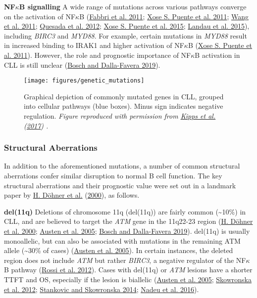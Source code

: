 \documentclass[11pt, a4paper, twosided]{book}
\begin{document}
\textbf{NF\(\kappa\)B signalling}
A wide range of mutations across various pathways converge on the activation of NF\(\kappa\)B (\protect\hyperlink{ref-Fabbri2011}{Fabbri et al. 2011}; \protect\hyperlink{ref-Puente2011}{Xose S. Puente et al. 2011}; \protect\hyperlink{ref-Wang2011}{Wang et al. 2011}; \protect\hyperlink{ref-Quesada2012}{Quesada et al. 2012}; \protect\hyperlink{ref-Puente2015}{Xose S. Puente et al. 2015}; \protect\hyperlink{ref-Landau2015}{Landau et al. 2015}), including \emph{BIRC3} and \emph{MYD88}. For example, certain mutations in \emph{MYD88} result in increased binding to IRAK1 and higher activation of NF\(\kappa\)B (\protect\hyperlink{ref-Puente2011}{Xose S. Puente et al. 2011}). However, the role and prognostic importance of NF\(\kappa\)B activation in CLL is still unclear (\protect\hyperlink{ref-Bosch2019}{Bosch and Dalla-Favera 2019}).


\begin{figure}

{\centering \texttt{[image: figures/genetic\_mutations]} 

}

\caption{Graphical depiction of commonly mutated genes in CLL, grouped into cellular pathways (blue boxes). Minus sign indicates negative regulation. \emph{Figure reproduced with permission from \protect\hyperlink{ref-Kipps2017}{Kipps et al.} (\protect\hyperlink{ref-Kipps2017}{2017}) .}}\label{fig:CLLmutations}
\end{figure}
\hypertarget{intro-structural-abberations}{%
\subsubsection{Structural Aberrations}\label{intro-structural-abberations}}

In addition to the aforementioned mutations, a number of common structural aberrations confer similar disruption to normal B cell function. The key structural aberrations and their prognostic value were set out in a landmark paper by \protect\hyperlink{ref-Dohner2000}{H. Döhner et al.} (\protect\hyperlink{ref-Dohner2000}{2000}), as follows.

\textbf{del(11q)}
Deletions of chromosome 11q (del(11q)) are fairly common (\textasciitilde10\%) in CLL, and are believed to target the \emph{ATM} gene in the 11q22-23 region (\protect\hyperlink{ref-Dohner2000}{H. Döhner et al. 2000}; \protect\hyperlink{ref-Austen2005}{Austen et al. 2005}; \protect\hyperlink{ref-Bosch2019}{Bosch and Dalla-Favera 2019}). del(11q) is usually monoallelic, but can also be associated with mutations in the remaining ATM allele (\textasciitilde30\% of cases) (\protect\hyperlink{ref-Austen2005}{Austen et al. 2005}). In certain instances, the deleted region does not include \emph{ATM} but rather \emph{BIRC3}, a negative regulator of the NF\(\kappa\)B pathway (\protect\hyperlink{ref-Rossi2012}{Rossi et al. 2012}). Cases with del(11q) or \emph{ATM} lesions have a shorter TTFT and OS, especially if the lesion is biallelic (\protect\hyperlink{ref-Austen2005}{Austen et al. 2005}; \protect\hyperlink{ref-Skowronska2012}{Skowronska et al. 2012}; \protect\hyperlink{ref-Stankovic2014}{Stankovic and Skowronska 2014}; \protect\hyperlink{ref-Nadeu2016}{Nadeu et al. 2016}).
\end{document}
